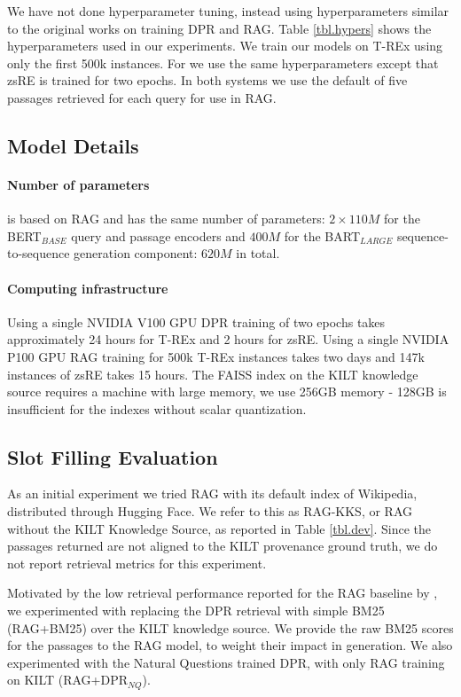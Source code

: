 We have not done hyperparameter tuning, instead using hyperparameters similar to the original works on training DPR and RAG. Table \ref{tbl.hypers} shows the hyperparameters used in our experiments. 
We train our models on T-REx using only the first 500k instances.
For  we use the same hyperparameters except that zsRE is trained for two epochs. In both \kgi{} systems we use the default of five passages retrieved for each query for use in RAG.

\subsection{Model Details}

\paragraph{Number of parameters}
\kgi{} is based on RAG and has the same number of parameters: $2 \times 110M$ for the BERT$_{BASE}$ query and passage encoders and $400M$ for the BART$_{LARGE}$ sequence-to-sequence generation component: $620M$ in total.

\paragraph{Computing infrastructure}
Using a single NVIDIA V100 GPU DPR training of two epochs takes approximately 24 hours for T-REx and 2 hours for zsRE.
Using a single NVIDIA P100 GPU RAG training for 500k T-REx instances takes two days and 147k instances of zsRE takes 15 hours.
The FAISS index on the KILT knowledge source requires a machine with large memory, we use 256GB memory - 128GB is insufficient for the indexes without scalar quantization.

\subsection{Slot Filling Evaluation}

As an initial experiment we tried RAG with its default index of Wikipedia, distributed through Hugging Face. We refer to this as RAG-KKS, or RAG without the KILT Knowledge Source, as reported in Table \ref{tbl.dev}. Since the passages returned are not aligned to the KILT provenance ground truth, we do not report retrieval metrics for this experiment.  

Motivated by the low retrieval performance reported for the RAG baseline by \citet{kilt}, we experimented with replacing the DPR retrieval with simple BM25 (RAG+BM25) over the KILT knowledge source. We provide the raw BM25 scores for the passages to the RAG model, to weight their impact in generation. We also experimented with the Natural Questions trained DPR, with only RAG training on KILT (RAG+DPR$_{NQ}$). 

